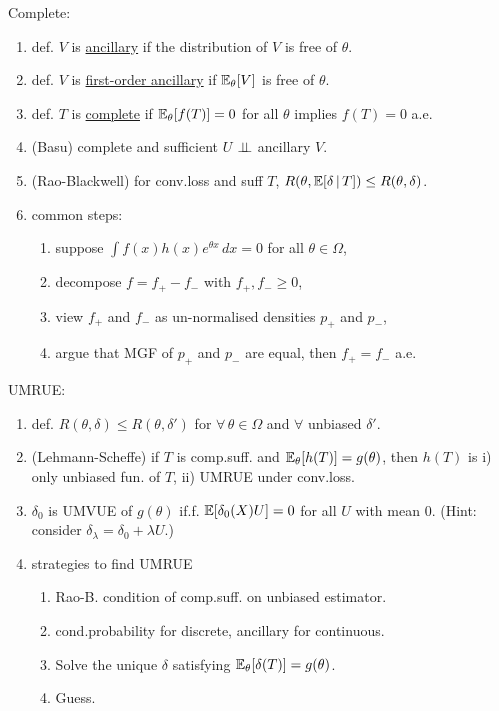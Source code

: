 Complete: %
    \begin{enumerate}[
        leftmargin = 2em,
    ]
    \item def. $V$ is \underline{ancillary} if the distribution of $V$ is free of $\theta$.
    \item def. $V$ is \underline{first-order ancillary} if $\mathbb{E}_\theta[V]$ is free of $\theta$.
    \item def. $T$ is \underline{complete} if $\mathbb{E}_\theta[f(T)] = 0$ for all $\theta$ implies $f(T) = 0$ a.e.
    \item (Basu) complete and sufficient $U$ $\perp\!\!\!\perp$ ancillary $V$.
    \item (Rao-Blackwell) for conv.loss and suff $T$, $R(\theta, \mathbb{E}[\delta \, | \, T] ) \leq R(\theta, \delta)$.
    \item common steps: \begin{enumerate}[leftmargin = 2em]
        \item suppose $\int f(x) h(x) e^{\theta x} \, dx = 0$ for all $\theta \in \Omega$,
        \item decompose $f = f_{+} - f_{-}$ with $f_{+}, f_{-} \geq 0$,
        \item view $f_+$ and $f_-$ as un-normalised densities $p_+$ and $p_-$,
        \item argue that MGF of $p_+$ and $p_-$ are equal, then $f_+ = f_-$ a.e.
    \end{enumerate}
\end{enumerate}

UMRUE: \begin{enumerate}[
        leftmargin = 2em,
    ]
    \item def. $R(\theta, \delta) \leq R(\theta, \delta')$ for $\forall\, \theta \in \Omega$ and $\forall$ unbiased $\delta'$.
    \item (Lehmann-Scheffe) if $T$ is comp.suff. and $\mathbb{E}_\theta[h(T)] = g(\theta)$, then $h(T)$ is i) only unbiased fun. of $T$, ii) UMRUE under conv.loss.
    \item $\delta_0$ is UMVUE of $g(\theta)$ if.f. $\mathbb{E}[\delta_0(X) U] = 0$ for all $U$ with mean 0. 
        \newline (Hint: consider $\delta_\lambda = \delta_0 + \lambda U$.)
    \item strategies to find UMRUE \begin{enumerate}[leftmargin = 2em]
        \item Rao-B. condition of comp.suff. on unbiased estimator.
        \item [] cond.probability for discrete, ancillary for continuous.
        \item Solve the unique $\delta$ satisfying $\mathbb{E}_\theta[\delta(T)] = g(\theta)$.
        \item Guess.
    \end{enumerate}
\end{enumerate}


